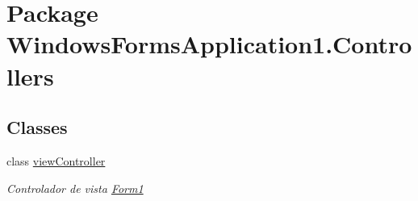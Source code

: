 \hypertarget{namespace_windows_forms_application1_1_1_controllers}{}\section{Package Windows\+Forms\+Application1.\+Controllers}
\label{namespace_windows_forms_application1_1_1_controllers}
\subsection*{Classes}
\begin{DoxyCompactItemize}
\item 
class \hyperlink{class_windows_forms_application1_1_1_controllers_1_1view_controller}{view\+Controller}
\begin{DoxyCompactList}\small\item\em Controlador de vista \hyperlink{class_windows_forms_application1_1_1_form1}{Form1} \end{DoxyCompactList}\end{DoxyCompactItemize}
